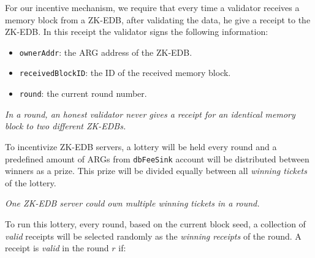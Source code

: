\documentclass[a4paper]{report}
\begin{document}
    For our incentive mechanism, we require that every time a validator receives a memory block from a ZK-EDB, after
    validating the data, he give a receipt to the ZK-EDB. In this receipt the validator signs the following information:

    \begin{itemize}
        \item \texttt{ownerAddr}: the ARG address of the ZK-EDB\@.
        \item \texttt{receivedBlockID}: the ID of the received memory block.
        \item \texttt{round}: the current round number.
    \end{itemize}

    \emph{In a round, an honest validator never gives a receipt for an identical memory block to two different ZK-EDBs.}

    To incentivize ZK-EDB servers, a lottery will be held every round and a predefined amount of ARGs from
    \texttt{dbFeeSink} account will be distributed between winners as a prize. This prize will be divided equally
    between all \emph{winning tickets} of the lottery.

    \emph{One ZK-EDB server could own multiple winning tickets in a round.}

    To run this lottery, every round, based on the current block seed, a collection of \emph{valid} receipts will be
    selected randomly as the \emph{winning receipts} of the round. A receipt is \emph{valid} in the round \(r\) if:
\end{document}
